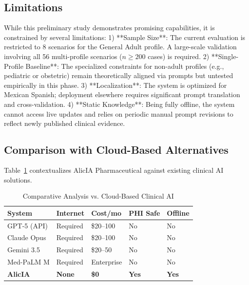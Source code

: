 \documentclass[9pt,conference]{IEEEtran}
\begin{document}
\subsection{Limitations}

While this preliminary study demonstrates promising capabilities, it is constrained by several limitations:
1) **Sample Size**: The current evaluation is restricted to 8 scenarios for the General Adult profile. A large-scale validation involving all 56 multi-profile scenarios ($n \geq 200$ cases) is required.
2) **Single-Profile Baseline**: The specialized constraints for non-adult profiles (e.g., pediatric or obstetric) remain theoretically aligned via prompts but untested empirically in this phase.
3) **Localization**: The system is optimized for Mexican Spanish; deployment elsewhere requires significant prompt translation and cross-validation.
4) **Static Knowledge**: Being fully offline, the system cannot access live updates and relies on periodic manual prompt revisions to reflect newly published clinical evidence.



\subsection{Comparison with Cloud-Based Alternatives}

Table~\ref{tab:compare} contextualizes AlicIA Pharmaceutical against
existing clinical AI solutions.

\begin{table}[H]
  \centering
  \caption{Comparative Analysis vs. Cloud-Based Clinical AI}
  \label{tab:compare}
  \renewcommand{\arraystretch}{1.2}
  \begin{tabular}{@{}p{2.0cm}p{1.1cm}p{1.2cm}p{1.1cm}p{1.0cm}@{}}
    \toprule
    \textbf{System} & \textbf{Internet} & \textbf{Cost/mo} &
    \textbf{PHI Safe} & \textbf{Offline} \\
    \midrule
    GPT-5  (API)    & Required & \$20--100 & No  & No \\
    Claude Opus      & Required & \$20--100 & No  & No \\
    Gemini 3.5  & Required & \$20--50  & No  & No \\
    Med-PaLM M      & Required & Enterprise& No  & No \\
    \textbf{AlicIA} & \textbf{None} & \textbf{\$0} & \textbf{Yes} & \textbf{Yes} \\
    \bottomrule
  \end{tabular}
\end{table}
\end{document}
